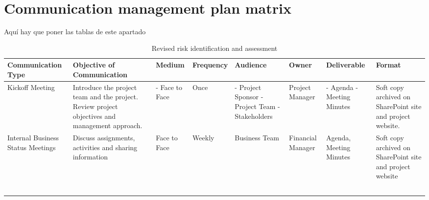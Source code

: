 \section{Communication management plan matrix}
\begin{landscape}
	
Aquí hay que poner las tablas de este apartado

\begin{table}[H]
	\centering
	\begin{tabular}{| >{\raggedright\arraybackslash}p{2.8cm}  | >{\raggedright\arraybackslash}p{3.2cm} | >{\raggedright\arraybackslash}p{2.4cm} | >{\raggedright\arraybackslash}p{1.8cm} | >{\raggedright\arraybackslash}p{2.4cm} | >{\raggedright\arraybackslash}p{1.8cm} | >{\raggedright\arraybackslash}p{2cm} | >{\raggedright\arraybackslash}p{2.8cm} |  }
		

\toprule [2pt]
		\textbf{Communication Type} & \textbf{Objective of Communication} & \textbf{Medium}  &\textbf{Frequency} &\textbf{Audience}& \textbf{Owner}& \textbf{Deliverable} &\textbf{Format} \\  
\midrule [1.5pt]
	
		Kickoff Meeting & Introduce the project team and the project. Review project objectives and management approach.  &  - Face to Face  & Once  &  - Project Sponsor \newline - Project Team \newline - Stakeholders   & Project Manager  & - Agenda \newline - Meeting Minutes & Soft copy archived on SharePoint site and project website. \\  
		
		\hline
		
		Internal Business Status Meetings& Discuss assignments, activities and sharing information  & Face to Face   &  Weekly &Business Team     & Financial Manager  & Agenda, Meeting Minutes  &Soft copy archived on SharePoint site and project website\\  
		
		\hline
		
		&   &    &   &     &   &   &\\  
		
		\hline
		
		&   &    &   &     &   &   &\\  
		
		\hline
		
		&   &    &   &     &   &   &\\  
		
		\hline
		
		&   &    &   &     &   &   &\\  
		
		\hline
		
		&   &    &   &     &   &   &\\  
		
		\bottomrule[2pt]
		
	\end{tabular}
	\caption{Revised risk identification and assessment}
\end{table}

\vspace*{\fill}


\end{landscape}